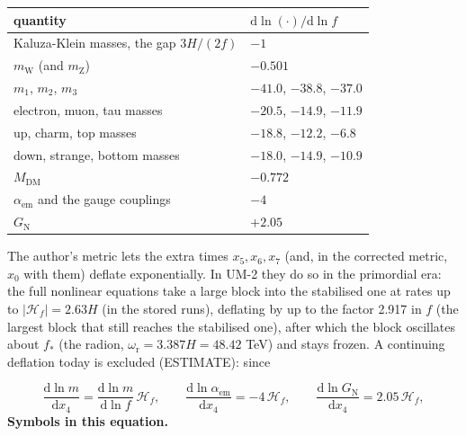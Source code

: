 \documentclass[
  10pt,
]{article}
\begin{document}
\begin{longtable}[]{@{}ll@{}}
\toprule\noalign{}
quantity & \(\mathrm{d}\ln(\cdot)/\mathrm{d}\ln f\) \\
\midrule\noalign{}
\endhead
\bottomrule\noalign{}
\endlastfoot
Kaluza-Klein masses, the gap \(3H/(2f)\) & \(-1\) \\
\(m_{\mathrm{W}}\) (and \(m_{\mathrm{Z}}\)) & \(-0.501\) \\
\(m_1\), \(m_2\), \(m_3\) & \(-41.0\), \(-38.8\), \(-37.0\) \\
electron, muon, tau masses & \(-20.5\), \(-14.9\), \(-11.9\) \\
up, charm, top masses & \(-18.8\), \(-12.2\), \(-6.8\) \\
down, strange, bottom masses & \(-18.0\), \(-14.9\), \(-10.9\) \\
\(M_{\mathrm{DM}}\) & \(-0.772\) \\
\(\alpha_{\mathrm{em}}\) and the gauge couplings & \(-4\) \\
\(G_{\mathrm{N}}\) & \(+2.05\) \\
\end{longtable}

The author's metric lets the extra times \(x_5, x_6, x_7\) (and, in the
corrected metric, \(x_0\) with them) deflate exponentially. In UM-2 they
do so in the primordial era: the full nonlinear equations take a large
block into the stabilised one at rates up to
\(\lvert\mathcal{H}_f\rvert = 2.63H\) (in the stored runs), deflating by
up to the factor 2.917 in \(f\) (the largest block that still reaches
the stabilised one), after which the block oscillates about \(f_*\) (the
radion, \(\omega_{\mathrm{r}} = 3.387H = 48.42\) TeV) and stays frozen.
A continuing deflation today is excluded (ESTIMATE): since

\[ \frac{\mathrm{d}\ln m}{\mathrm{d}x_4} = \frac{\mathrm{d}\ln m}{\mathrm{d}\ln f}\,\mathcal{H}_f,\qquad \frac{\mathrm{d}\ln\alpha_{\mathrm{em}}}{\mathrm{d}x_4} = -4\,\mathcal{H}_f,\qquad \frac{\mathrm{d}\ln G_{\mathrm{N}}}{\mathrm{d}x_4} = 2.05\,\mathcal{H}_f, \]
\textbf{Symbols in this equation.}
\end{document}
